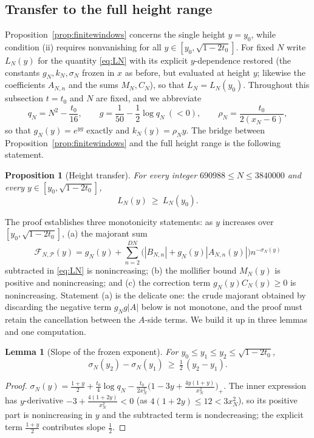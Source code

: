 \documentclass[11pt]{article}
\newtheorem{lemma}[theorem]{Lemma}
\newtheorem{proposition}[theorem]{Proposition}
\theoremstyle{definition}
\newcommand{\calP}{\mathcal{P}}
\begin{document}
\subsection{Transfer to the full height range}\label{sec:dini}

Proposition~\ref{prop:finitewindows} concerns the single height $y=y_0$,
while condition (ii) requires nonvanishing for all
$y\in[y_0,\sqrt{1-2t_0}]$. For fixed $N$ write $L_N(y)$ for the
quantity \eqref{eq:LN} with its explicit $y$-dependence restored
(the constants $g_N,k_N,\sigma_N$ frozen in $x$ as before, but
evaluated at height $y$; likewise the coefficients $A_{N,n}$ and the
sums $M_N,C_N$), so that $L_N=L_N(y_0)$. Throughout this subsection
$t=t_0$ and $N$ are fixed, and we abbreviate
\[
q_N=N^2-\frac{t_0}{16},
\qquad
g=\frac1{50}-\frac12\log q_N\ (<0),
\qquad
\rho_N=\frac{t_0}{2(x_N-6)},
\]
so that $g_N(y)=e^{yg}$ exactly and $k_N(y)=\rho_Ny$. The bridge
between Proposition~\ref{prop:finitewindows} and the full height range is
the following statement.

\begin{proposition}[Height transfer]\label{prop:transfer}
For every integer $690988\le N\le3840000$ and every
$y\in[y_0,\sqrt{1-2t_0}]$,
\[
L_N(y)\ \ge\ L_N(y_0).
\]
\end{proposition}

The proof establishes three monotonicity statements: as $y$
increases over $[y_0,\sqrt{1-2t_0}]$, (a) the majorant sum
\[
\mathcal F_{N,\calP}(y)
=g_N(y)+\sum_{n=2}^{DN}
\bigl(|B_{N,n}|+g_N(y)|A_{N,n}(y)|\bigr)n^{-\sigma_N(y)}
\]
subtracted in \eqref{eq:LN} is nonincreasing; (b) the mollifier
bound $M_N(y)$ is positive and nonincreasing; and (c) the correction
term $g_N(y)C_N(y)\ge0$ is nonincreasing. Statement (a) is the
delicate one: the crude
majorant obtained by discarding the negative term $g_N g|A|$ below
is not monotone, and the proof must retain the cancellation between
the $A$-side terms. We build it up in three lemmas and one
computation.

\begin{lemma}[Slope of the frozen exponent]\label{lem:sigmaslope}
For $y_0\le y_1\le y_2\le\sqrt{1-2t_0}$,
\[
\sigma_N(y_2)-\sigma_N(y_1)\ \ge\ \tfrac12\,(y_2-y_1).
\]
\end{lemma}

\begin{proof}
$\sigma_N(y)=\frac{1+y}2+\frac{t_0}4\log q_N
-\frac{t_0}{2x_N^2}\bigl(1-3y+\frac{4y(1+y)}{x_N^2}\bigr)_+$. The
inner expression has $y$-derivative $-3+\frac{4(1+2y)}{x_N^2}<0$
(as $4(1+2y)\le12<3x_N^2$), so its positive part is nonincreasing
in $y$ and the subtracted term is nondecreasing; the explicit term
$\frac{1+y}2$ contributes slope $\frac12$.
\end{proof}
\end{document}
